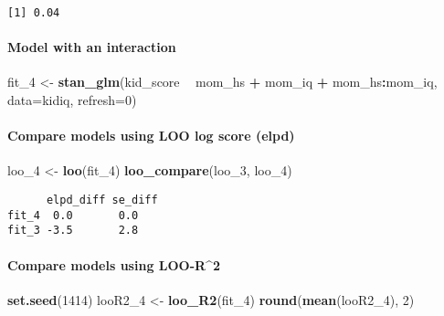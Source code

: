 \documentclass[
]{article}
\newenvironment{Shaded}{\begin{snugshade}}{\end{snugshade}}
\newcommand{\DataTypeTok}[1]{\textcolor[rgb]{0.13,0.29,0.53}{#1}}
\newcommand{\DecValTok}[1]{\textcolor[rgb]{0.00,0.00,0.81}{#1}}
\newcommand{\KeywordTok}[1]{\textcolor[rgb]{0.13,0.29,0.53}{\textbf{#1}}}
\newcommand{\NormalTok}[1]{#1}
\newcommand{\OperatorTok}[1]{\textcolor[rgb]{0.81,0.36,0.00}{\textbf{#1}}}
\newcommand{\StringTok}[1]{\textcolor[rgb]{0.31,0.60,0.02}{#1}}
\begin{document}
\begin{verbatim}
[1] 0.04
\end{verbatim}

\hypertarget{model-with-an-interaction}{%
\paragraph{Model with an interaction}\label{model-with-an-interaction}}

\begin{Shaded}
\begin{Highlighting}[]
\NormalTok{fit_}\DecValTok{4}\NormalTok{ <-}\StringTok{ }\KeywordTok{stan_glm}\NormalTok{(kid_score }\OperatorTok{~}\StringTok{ }\NormalTok{mom_hs }\OperatorTok{+}\StringTok{ }\NormalTok{mom_iq }\OperatorTok{+}\StringTok{ }\NormalTok{mom_hs}\OperatorTok{:}\NormalTok{mom_iq,}
                  \DataTypeTok{data=}\NormalTok{kidiq, }\DataTypeTok{refresh=}\DecValTok{0}\NormalTok{)}
\end{Highlighting}
\end{Shaded}

\hypertarget{compare-models-using-loo-log-score-elpd-1}{%
\paragraph{Compare models using LOO log score
(elpd)}\label{compare-models-using-loo-log-score-elpd-1}}

\begin{Shaded}
\begin{Highlighting}[]
\NormalTok{loo_}\DecValTok{4}\NormalTok{ <-}\StringTok{ }\KeywordTok{loo}\NormalTok{(fit_}\DecValTok{4}\NormalTok{)}
\KeywordTok{loo_compare}\NormalTok{(loo_}\DecValTok{3}\NormalTok{, loo_}\DecValTok{4}\NormalTok{)}
\end{Highlighting}
\end{Shaded}

\begin{verbatim}
      elpd_diff se_diff
fit_4  0.0       0.0   
fit_3 -3.5       2.8   
\end{verbatim}

\hypertarget{compare-models-using-loo-r2-1}{%
\paragraph{Compare models using
LOO-R\^{}2}\label{compare-models-using-loo-r2-1}}

\begin{Shaded}
\begin{Highlighting}[]
\KeywordTok{set.seed}\NormalTok{(}\DecValTok{1414}\NormalTok{)}
\NormalTok{looR2_}\DecValTok{4}\NormalTok{ <-}\StringTok{ }\KeywordTok{loo_R2}\NormalTok{(fit_}\DecValTok{4}\NormalTok{)}
\KeywordTok{round}\NormalTok{(}\KeywordTok{mean}\NormalTok{(looR2_}\DecValTok{4}\NormalTok{), }\DecValTok{2}\NormalTok{)}
\end{Highlighting}
\end{Shaded}
\end{document}

